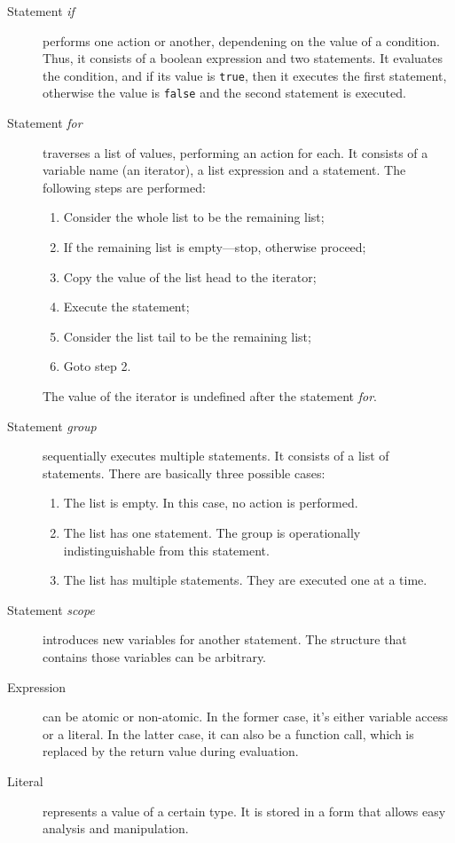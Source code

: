 \documentclass [a4paper] {article}
\begin{document}
\begin {description}
\item [Statement \emph{if}] performs one action or another, dependening on the
value of a condition. Thus, it consists of a boolean expression and two
statements. It evaluates the condition, and if its value is \texttt{true}, then
it executes the first statement, otherwise the value is \texttt{false} and the
second statement is executed.

\item [Statement \emph{for}] traverses a list of values, performing an action
for each. It consists of a variable name (an iterator), a list expression and a
statement. The following steps are performed:
\begin {enumerate}
\item Consider the whole list to be the remaining list;
\item If the remaining list is empty---stop, otherwise proceed;
\item Copy the value of the list head to the iterator;
\item Execute the statement;
\item Consider the list tail to be the remaining list;
\item Goto step 2.
\end {enumerate}
The value of the iterator is undefined after the statement \emph{for}.

\item [Statement \emph{group}] sequentially executes multiple statements. It
consists of a list of statements. There are basically three possible cases:
\begin {enumerate}
\item The list is empty. In this case, no action is performed.
\item The list has one statement. The group is operationally indistinguishable
from this statement.
\item The list has multiple statements. They are executed one at a time.
\end {enumerate}

\item [Statement \emph{scope}] introduces new variables for another statement.
The structure that contains those variables can be arbitrary.

\item [Expression] can be atomic or non-atomic. In the former case, it's either
variable access or a literal. In the latter case, it can also be a function
call, which is replaced by the return value during evaluation.

\item [Literal] represents a value of a certain type. It is stored in a form
that allows easy analysis and manipulation.

\end {description}
\end{document}
